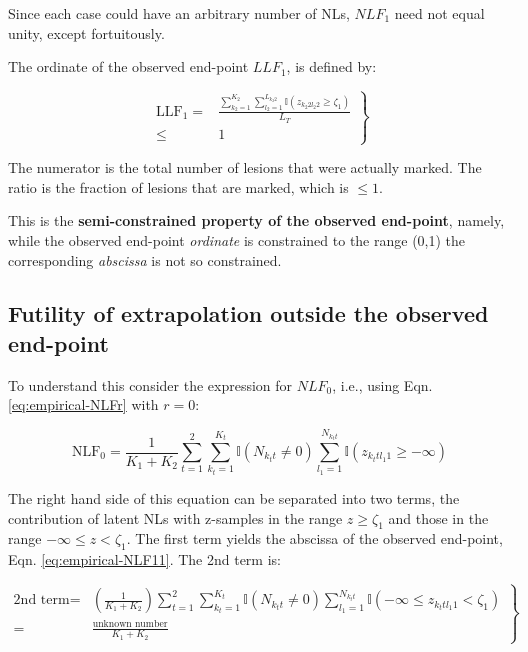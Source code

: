 \documentclass[
]{book}
\begin{document}
Since each case could have an arbitrary number of NLs, \(NLF_1\) need not equal unity, except fortuitously.

The ordinate of the observed end-point \(LLF_1\), is defined by:

\begin{equation}
\left.
\begin{aligned}
\text{LLF}_1 =& \frac{ \sum_{k_2=1}^{K_2} \sum_{l_2=1}^{L_{k_2 2}} \mathbb{I} \left ( z_{k_2 2 l_2 2} \geq  \zeta_1  \right ) }{L_T}\\
\leq& 1
\end{aligned}
\right \}
\label{eq:empirical-LLF1a}
\end{equation}

The numerator is the total number of lesions that were actually marked. The ratio is the fraction of lesions that are marked, which is \(\leq 1\).

This is the \textbf{semi-constrained property of the observed end-point}, namely, while the observed end-point \emph{ordinate} is constrained to the range (0,1) the corresponding \emph{abscissa} is not so constrained.

\hypertarget{empirical-froc-plot-futility-extrapolation}{%
\subsection{Futility of extrapolation outside the observed end-point}\label{empirical-froc-plot-futility-extrapolation}}

To understand this consider the expression for \(NLF_0\), i.e., using Eqn. \eqref{eq:empirical-NLFr} with \(r = 0\):

\begin{equation}
\text{NLF}_0 = \frac{1}{K_1+K_2} \sum_{t=1}^{2} \sum_{k_t=1}^{K_t} \mathbb{I} \left ( N_{k_t t} \neq 0 \right ) \sum_{l_1=1}^{N_{k_t t}} \mathbb{I} \left ( z_{k_t t l_1 1} \geq -\infty \right ) 
\end{equation}

The right hand side of this equation can be separated into two terms, the contribution of latent NLs with z-samples in the range \(z \geq \zeta_1\) and those in the range \(-\infty \leq z < \zeta_1\). The first term yields the abscissa of the observed end-point, Eqn. \eqref{eq:empirical-NLF11}. The 2nd term is:

\begin{equation}
\left. 
\begin{aligned} 
\text{2nd term}=&\left (\frac{1}{K_1+K_2} \right )\sum_{t=1}^{2} \sum_{k_t=1}^{K_t} \mathbb{I} \left ( N_{k_t t} \neq 0 \right ) \sum_{l_1=1}^{N_{k_t t}} \mathbb{I} \left ( -\infty \leq z_{k_t t l_1 1} < \zeta_1 \right )\\
=&\frac{\text{unknown number}}{K_1+K_2}
\end{aligned}
\right \} 
\label{eq:empirical-NLF0a}
\end{equation}
\end{document}
